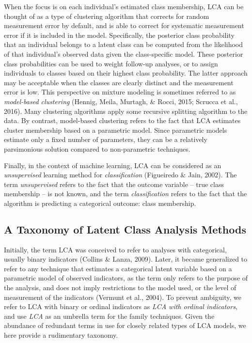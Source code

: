 \documentclass[
  ,man,floatsintext]{apa6}
\begin{document}
When the focus is on each individual's estimated class membership,
LCA can be thought of as a type of clustering algorithm that corrects for random measurement error by default, and is able to correct for systematic measurement error if it is included in the model.
Specifically, the posterior class probability that an individual belongs to a latent class
can be computed from the likelihood of that individual's observed data given the class-specific model.
These posterior class probabilities can be used to weight follow-up analyses,
or to assign individuals to classes based on their highest class probability.
The latter approach may be acceptable when the classes are clearly distinct and the measurement error is low.
This perspective on mixture modeling is sometimes referred to as \emph{model-based
clustering} (Hennig, Meila, Murtagh, \& Rocci, 2015; Scrucca et al., 2016).
Many clustering algorithms apply some recursive splitting algorithm to the data.
By contrast, model-based clustering refers to the fact that LCA estimates
cluster membership based on a parametric model.
Since parametric models estimate only a fixed number of parameters,
they can be a relatively parsimonious solution compared to non-parametric techniques.

Finally, in the context of machine learning, LCA can be considered as an
\emph{unsupervised} learning method for \emph{classification} (Figueiredo \& Jain, 2002).
The term \emph{unsupervised} refers to the fact that the outcome variable --
true class membership -- is not known, and the term \emph{classification}
refers to the fact that the algorithm is predicting a categorical
outcome: class membership.

\hypertarget{a-taxonomy-of-latent-class-analysis-methods}{%
\subsection{A Taxonomy of Latent Class Analysis Methods}\label{a-taxonomy-of-latent-class-analysis-methods}}

Initially, the term LCA was conceived to refer to analyses with categorical,
usually binary indicators (Collins \& Lanza, 2009).
Later, it became generalized to refer to any technique that estimates a categorical latent variable based on a
parametric model of observed indicators, as the term only refers
to the purpose of the analysis, and does not imply restrictions to the
model used, or the level of measurement of the indicators (Vermunt et al., 2004).
To prevent ambiguity, we refer to LCA with binary or ordinal indicators as \emph{LCA with ordinal indicators},
and use \emph{LCA} as an umbrella term for the family techniques.
Given the abundance of redundant terms in use for closely related types of LCA models,
we here provide a rudimentary taxonomy.
\end{document}
